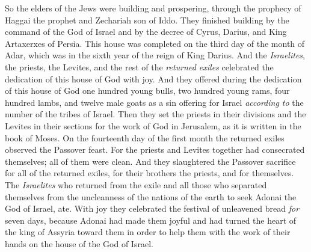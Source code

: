 \begin{biblechapter}
\verse So the elders of the Jews were building and prospering, through the prophecy of Haggai the prophet and Zechariah son of Iddo. They finished building by the command of the God of Israel and by the decree of Cyrus, Darius, and King Artaxerxes of Persia.
\verse This house was completed on the third day of the month of Adar, which was in the sixth year of the reign of King Darius.
\verse And the \textit{Israelites}, the priests, the Levites, and the rest of the \textit{returned exiles} celebrated the dedication of this house of God with joy.
\verse And they offered during the dedication of this house of God one hundred young bulls, two hundred young rams, four hundred lambs, and twelve male goats as a sin offering for Israel \textit{according to} the number of the tribes of Israel.
\verse Then they set the priests in their divisions and the Levites in their sections for the work of God in Jerusalem, as it is written in the book of Moses.
 On the fourteenth day of the first month the returned exiles observed the Passover feast.
\verse For the priests and Levites together had consecrated themselves; all of them were clean. And they slaughtered the Passover sacrifice for all of the returned exiles, for their brothers the priests, and for themselves.
\verse The \textit{Israelites} who returned from the exile and all those who separated themselves from the uncleanness of the nations of the earth to seek Adonai the God of Israel, ate.
\verse With joy they celebrated the festival of unleavened bread \textit{for} seven days, because Adonai had made them joyful and had turned the heart of the king of Assyria toward them in order to help them with the work of their hands on the house of the God of Israel.
\end{biblechapter}


